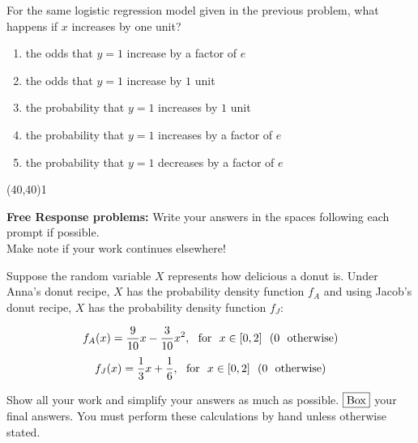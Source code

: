 \documentclass[addpoints]{exam}
\def\solutions{0}
\begin{document}
{\begin{questions}
\question[3] For the same logistic regression model given in the previous problem, what happens if $x$ increases by one unit?

\vspace{2mm}

\begin{minipage}[b]{.85\textwidth}
	\begin{enumerate}[label=\Alph*.]
		\item the odds that $y = 1$ increase by a factor of $e$
		\item the odds that $y = 1$ increase by $1$ unit
		\item the probability that $y = 1$ increases by $1$ unit
		\item the probability that $y = 1$ increases by a factor of $e$
		\item the probability that $y = 1$ decreases by a factor of $e$
	\end{enumerate}
\end{minipage}
\begin{minipage}[b]{.1\textwidth}
	\vspace{\fill}\framebox(40,40){\if\solutions1 \fi}
\end{minipage}
\clearpage


{\begin{center} {\bf Free Response problems:} Write your answers in the spaces following each prompt if possible.\\  Make note if your work continues elsewhere!\end{center}}\vspace{2mm}

\question[18] Suppose the random variable $X$ represents how delicious a donut is. Under Anna's donut recipe, $X$ has the probability density function $f_A$ and using Jacob's donut recipe, $X$ has the probability density function $f_J$:

$$f_A(x) = \frac{9}{10}x - \frac{3}{10}x^2,  \ \ \textnormal{for} \ \ x \in [0, 2] \ \  (0 \ \ \textnormal{otherwise}) $$
$$f_J(x) = \frac{1}{3}x + \frac{1}{6},  \ \ \textnormal{for} \ \ x \in [0, 2] \ \  (0 \ \ \textnormal{otherwise}) $$

Show all your work and simplify your answers as much as possible. $\fbox{Box}$ your final answers. You must perform these calculations by hand unless otherwise stated.


\end{questions}}
\end{document}
